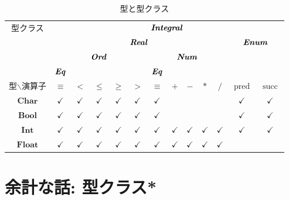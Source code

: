 \documentclass[a5paper,draft]{jsbook}
\newcommand{\mathTypeParameter}[1]{\mathbf{#1}}
\newcommand{\mathTypeName}[1]{\textbf{#1}}
\newcommand{\mathTypeClass}[1]{\textbf{\emph{#1}}} %
\DeclareMathOperator{\mathPred}{pred}
\DeclareMathOperator{\mathSucc}{succ}
\newcommand{\hsklBool}{\mathTypeParameter{Bool}}
\newcommand{\hsklChar}{\mathTypeParameter{Char}}
\newcommand{\hsklFloat}{\mathTypeParameter{Float}}
\begin{document}
\begin{table*}
\caption{型と型クラス}
\label{tab:type-and-typeclass}
\begin{center}
\begin{tabular}{||c||c|c|c|c|c|c|c|c|c|c|c|c||}
\hline
\multirow{4}{*}{型クラス}
    &\multicolumn{12}{|c||}{$\mathTypeClass{Integral}$}\\
\cline{2-13}
\multirow{3}{*}{}
    &\multicolumn{10}{|c|}{$\mathTypeClass{Real}$}
    &\multicolumn{2}{|c||}{$\mathTypeClass{Enum}$}\\
\cline{2-11}
\multirow{2}{*}{}
    &\multicolumn{5}{|c|}{$\mathTypeClass{Ord}$}
    &\multicolumn{5}{|c|}{$\mathTypeClass{Num}$}
    &\multicolumn{2}{|c||}{ }\\
\cline{2-2}\cline{7-7}
{ }
    &$\mathTypeClass{Eq}$
    &\multicolumn{4}{|c|}{ }
    &$\mathTypeClass{Eq}$
    &\multicolumn{4}{|c|}{ }
    &\multicolumn{2}{|c||}{ }\\
\hline\hline
型$\backslash$演算子
    &$\equiv$
    &$<$
    &$\le$
    &$\ge$
    &$>$
    &$\equiv$
    &$+$
    &$-$
    &$*$
    &$/$
    &$\mathPred$
    &$\mathSucc$\\
\hline
$\hsklChar$
    &$\checkmark$
    &$\checkmark$
    &$\checkmark$
    &$\checkmark$
    &$\checkmark$
    &$\checkmark$
    &
    &
    &
    &
    &$\checkmark$
    &$\checkmark$\\
\hline
$\hsklBool$
    &$\checkmark$
    &$\checkmark$
    &$\checkmark$
    &$\checkmark$
    &$\checkmark$
    &$\checkmark$
    &
    &
    &
    &
    &$\checkmark$
    &$\checkmark$\\
\hline
$\mathTypeName{Int}$
    &$\checkmark$
    &$\checkmark$
    &$\checkmark$
    &$\checkmark$
    &$\checkmark$
    &$\checkmark$
    &$\checkmark$
    &$\checkmark$
    &$\checkmark$
    &$\checkmark$
    &$\checkmark$
    &$\checkmark$\\
\hline
$\hsklFloat$
    &$\checkmark$
    &$\checkmark$
    &$\checkmark$
    &$\checkmark$
    &$\checkmark$
    &$\checkmark$
    &$\checkmark$
    &$\checkmark$
    &$\checkmark$
    &$\checkmark$
    &
    &\\
\hline
\end{tabular}
\end{center}
\end{table*}

\section{余計な話: 型クラス*}
\end{document}
